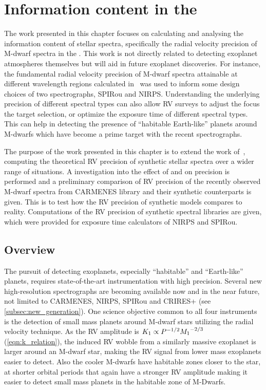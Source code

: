 
\chapter{Information content in the \nir{}}
\label{cha:nir_content}

The work presented in this chapter focuses on calculating and analysing the information content of stellar spectra, specifically the radial velocity precision of M-dwarf spectra in the \nir{}.
This work is not directly related to detecting exoplanet atmospheres themselves but will aid in future exoplanet discoveries.
For instance, the fundamental radial velocity precision of {M-dwarf} spectra attainable at different wavelength regions calculated in~\citet{figueira_radial_2016} was used to inform some design choices of two \nir{} spectrographs, {SPIRou} and {NIRPS}.
Understanding the underlying precision of different spectral types can also allow {RV} surveys to adjust the focus the target selection, or optimize the exposure time of different spectral types.
This can help in detecting the presence of ``habitable Earth-like'' planets around {M-dwarfs} which have become a prime target with the recent \nir{} spectrographs.

The purpose of the work presented in this chapter is to extend the work of~\citet{figueira_radial_2016}, computing the theoretical {RV} precision of synthetic stellar spectra over a wider range of situations.
A investigation into the effect of \Logg{} and \feh{} on precision is performed and a preliminary comparison of {RV} precision of the recently observed \nir{} {M-dwarf} spectra from {CARMENES} library and their synthetic counterparts is given.
This is to test how the {RV} precision of synthetic models compares to reality.
Computations of the {RV} precision of synthetic spectral libraries are given, which were provided for exposure time calculators of {NIRPS} and {SPIRou}.


\section{Overview}
\label{sec:precision_overview}
The pursuit of detecting exoplanets, especially ``habitable'' and ``Earth-like'' planets, requires state-of-the-art instrumentation with high precision.
Several new high-resolution \nir{} spectrographs are becoming available now and in the near future, not limited to {CARMENES}, {NIRPS}, {SPIRou} and {CRIRES+} (see \cref{subsec:new_generation}).
One science objective common to all four instruments is the detection of small mass planets around {M-dwarf} stars utilizing the radial velocity technique.
As the {RV} amplitude is \({K}_{1}\propto {P}^{-{1/2}}{{M}_{1}}^{-2/3}\) (\cref{eqn:k_relation}), the induced {RV} wobble from a similarly massive exoplanet is larger around an M-dwarf star, making the {RV} signal from lower mass exoplanets easier to detect.
Also the cooler {M-dwarfs} have habitable zones closer to the star, at shorter orbital periods that again have a stronger {RV} amplitude making it easier to detect small mass planets in the habitable zone of {M-Dwarfs}.

